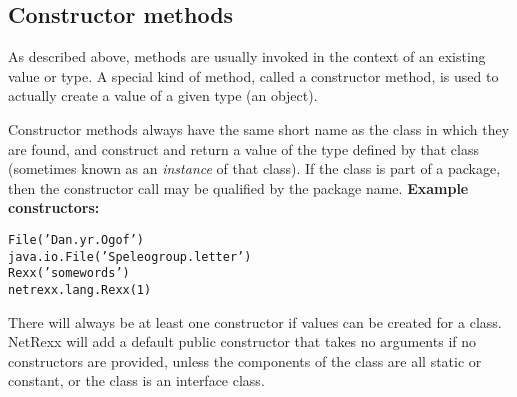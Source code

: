 \subsection{Constructor methods}\label{"id"}
\index{,}
 
As described above, methods are usually invoked in the context of an
existing value or type.
A special kind of method, called a constructor method, is used to
actually create a value of a given type (an object).
 
Constructor methods always have the same short name as the class in
which they are found, and construct and return a value of the type
defined by that class (sometimes known as an \emph{instance} of that
class).
If the class is part of a package, then the constructor call may be
qualified by the package name.
 \textbf{Example constructors:}
\begin{alltt}
File('Dan.yr.Ogof')
java.io.File('Speleogroup.letter')
Rexx('some words')
netrexx.lang.Rexx(1)
\end{alltt}
 
There will always be at least one constructor if values can be created
for a class.  NetRexx will add a default public constructor that takes
no arguments if no constructors are provided, unless the components of
the class are all static or constant, or the class is an interface
class.
 
